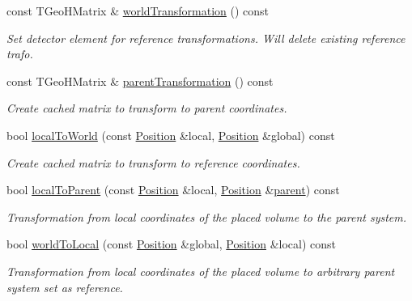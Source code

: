 \begin{DoxyCompactItemize}
const T\+Geo\+H\+Matrix \& \hyperlink{class_d_d4hep_1_1_geometry_1_1_det_element_acaf0a39faf4eeab43c30158c9a7169ec}{world\+Transformation} () const
\begin{DoxyCompactList}\small\item\em Set detector element for reference transformations. Will delete existing reference trafo. \end{DoxyCompactList}\item 
const T\+Geo\+H\+Matrix \& \hyperlink{class_d_d4hep_1_1_geometry_1_1_det_element_a0d916c1f8d25cfc4e4b38bb44b4dc2d2}{parent\+Transformation} () const
\begin{DoxyCompactList}\small\item\em Create cached matrix to transform to parent coordinates. \end{DoxyCompactList}\item 
bool \hyperlink{class_d_d4hep_1_1_geometry_1_1_det_element_a89378b5ed5ac76d41ac4013d21e82387}{local\+To\+World} (const \hyperlink{namespace_d_d4hep_1_1_geometry_a55083902099d03506c6db01b80404900}{Position} \&local, \hyperlink{namespace_d_d4hep_1_1_geometry_a55083902099d03506c6db01b80404900}{Position} \&global) const
\begin{DoxyCompactList}\small\item\em Create cached matrix to transform to reference coordinates. \end{DoxyCompactList}\item 
bool \hyperlink{class_d_d4hep_1_1_geometry_1_1_det_element_a4e1874622d6fb893541a8580e6056873}{local\+To\+Parent} (const \hyperlink{namespace_d_d4hep_1_1_geometry_a55083902099d03506c6db01b80404900}{Position} \&local, \hyperlink{namespace_d_d4hep_1_1_geometry_a55083902099d03506c6db01b80404900}{Position} \&\hyperlink{class_d_d4hep_1_1_geometry_1_1_det_element_ab26ab7d0bd3b8641dbfc34b84d874979}{parent}) const
\begin{DoxyCompactList}\small\item\em Transformation from local coordinates of the placed volume to the parent system. \end{DoxyCompactList}\item 
bool \hyperlink{class_d_d4hep_1_1_geometry_1_1_det_element_acbfaa3838fb9d3b6120ea8fe289cdb15}{world\+To\+Local} (const \hyperlink{namespace_d_d4hep_1_1_geometry_a55083902099d03506c6db01b80404900}{Position} \&global, \hyperlink{namespace_d_d4hep_1_1_geometry_a55083902099d03506c6db01b80404900}{Position} \&local) const
\begin{DoxyCompactList}\small\item\em Transformation from local coordinates of the placed volume to arbitrary parent system set as reference. \end{DoxyCompactList}\item 

\end{DoxyCompactItemize}

